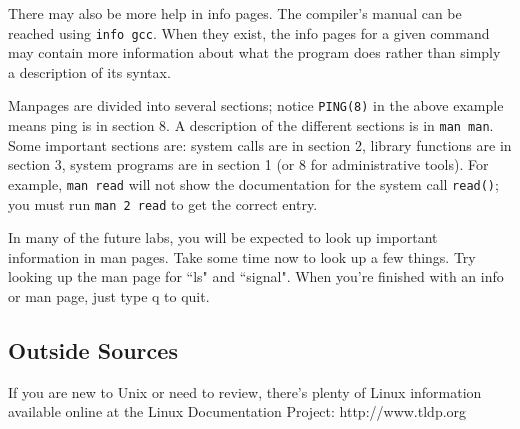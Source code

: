 \documentclass[letterpaper,10pt]{article}
\newcommand{\cmd}[1]{\texttt{#1}}
\begin{document}
There may also be more help in info pages. The compiler's manual can be reached using \cmd{info gcc}. When they exist, the info pages for a given command may contain more information about what the program does rather than simply a description of its syntax.

Manpages are divided into several sections; notice \texttt{PING(8)} in the above example means ping is in section 8. A description of the different sections is in \cmd{man man}. Some important sections are: system calls are in section 2, library functions are in section 3, system programs are in section 1 (or 8 for administrative tools). For example, \cmd{man read} will not show the documentation for the system call \texttt{read()}; you must run \cmd{man 2 read} to get the correct entry.

In many of the future labs, you will be expected to look up important information in man pages.
Take some time now to look up a few things. Try looking up the man page for ``ls" and ``signal".
When you're finished with an info or man page, just type q to quit.

\subsection{Outside Sources}
If you are new to Unix or need to review, there's plenty of Linux information available online at the Linux Documentation Project: http://www.tldp.org
\end{document}
